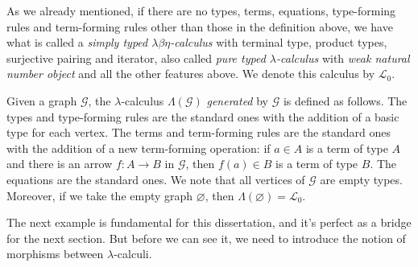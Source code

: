 \begin{example}
    As we already mentioned, if there are no types, terms, equations, type-forming rules and term-forming rules other than those in the definition above,
    we have what is called a \emph{simply typed $\lambda\beta\eta$-calculus} with terminal type, product types, surjective pairing and iterator,
    also called \emph{pure typed $\lambda$-calculus} with \emph{weak natural number object} and all the other features above. We denote this calculus by $\mathcal L_0$.
\end{example}

\begin{example}
    Given a graph $\mathcal G$, the $\lambda$-calculus $\Lambda(\mathcal G)$ \emph{generated} by $\mathcal G$ is defined as follows.
    The types and type-forming rules are the standard ones with the addition of a basic type for each vertex. The terms and term-forming rules are the standard ones
    with the addition of a new term-forming operation: if $a \in A$ is a term of type $A$ and there is an arrow $f : A \to B$ in $\mathcal G$,
    then $f(a) \in B$ is a term of type $B$. The equations are the standard ones.\newline
    We note that all vertices of $\mathcal G$ are empty types. Moreover, if we take the empty graph $\varnothing$, then $\Lambda(\varnothing) = \mathcal L_0$.
\end{example}

The next example is fundamental for this dissertation, and it's perfect as a bridge for the next section.
But before we can see it, we need to introduce the notion of morphisms between $\lambda$-calculi.

